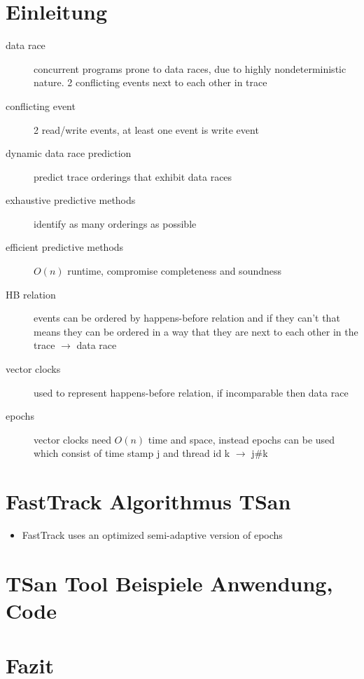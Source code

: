\documentclass[11pt]{article}
\begin{document}
	\section{Einleitung}
	\begin{description}
		\item[data race] concurrent programs prone to data races, due to highly nondeterministic nature. 2 conflicting events next to each other in trace
		\item[conflicting event] 2 read/write events, at least one event is write event
		\item[dynamic data race prediction] predict trace orderings that exhibit data races
		\item[exhaustive predictive methods] identify as many orderings as possible
		\item[efficient predictive methods] \(O(n)\) runtime, compromise completeness and soundness
		\item[HB relation] events can be ordered by happens-before relation and if they can't that means they can be ordered in a way that they are next to each other in the trace $\rightarrow$ data race
		\item[vector clocks] used to represent happens-before relation, if incomparable then data race
		\item[epochs] vector clocks need \(O(n)\) time and space, instead epochs can be used which consist of time stamp j and thread id k $\rightarrow$ j\#k
	\end{description}
	
	\section{FastTrack Algorithmus TSan}
	\begin{itemize}
		\item FastTrack uses an optimized semi-adaptive version of epochs
	\end{itemize} \cite{cormac} \cite{sulzmann}
	
	\section{TSan Tool Beispiele Anwendung, Code}
	
	\section{Fazit}
	
	\newpage                                          
	\printbibliography[heading= bibintoc, title={Literaturverzeichnis}]
	\newpage
	\listoffigures
	\newpage
	\listoftables
\end{document}
